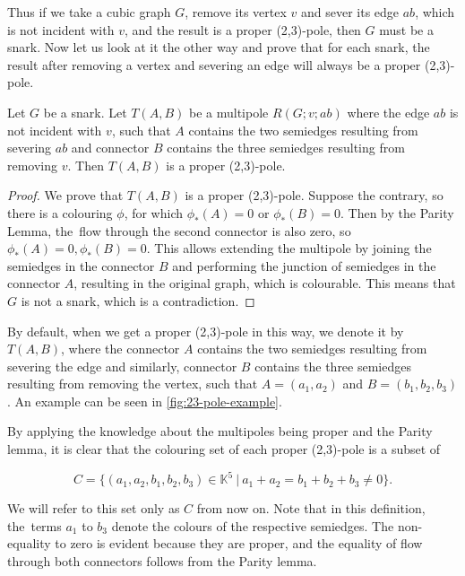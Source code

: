 Thus if we take a cubic graph $G$, remove its vertex $v$ and sever its edge $ab$, which is not incident with $v$, and the result is a proper (2,3)-pole, then $G$ must be a snark. Now let us look at it the other way and prove that for each snark, the result after removing a vertex and severing an edge will always be a proper (2,3)-pole.

\begin{lemma}
	Let $G$ be a snark. Let $T(A,B)$ be a multipole $R(G;v;ab)$ where the edge $ab$ is not incident with $v$, such that $A$ contains the two semiedges resulting from severing $ab$ and connector $B$ contains the three semiedges resulting from removing $v$. Then $T(A,B)$ is a proper (2,3)-pole.
\end{lemma}

\begin{proof}
	We prove that $T(A,B)$ is a proper (2,3)-pole. Suppose the contrary, so there is a colouring $\phi$, for which $\phi_*(A)=0$ or $\phi_*(B)=0$. Then by the Parity Lemma, the~flow through the second connector is also zero, so $\phi_*(A)=0, \phi_*(B)=0$. This allows extending the multipole by joining the semiedges in the connector $B$ and performing the junction of semiedges in the connector $A$, resulting in the original graph, which is colourable. This means that $G$ is not a snark, which is a contradiction.
\end{proof}

By default, when we get a proper (2,3)-pole in this way, we denote it by $T(A,B)$, where the connector $A$ contains the two semiedges resulting from severing the edge and similarly, connector $B$ contains the three semiedges resulting from removing the vertex, such that $A=(a_1,a_2)$ and $B=(b_1,b_2,b_3)$. An example can be seen in \cref{fig:23-pole-example}.

\begin{figure*}
	\centering
	
	\caption{Creation of a proper $(2,3)$-pole from a snark $G$}
	\label{fig:23-pole-example}
\end{figure*}

By applying the knowledge about the multipoles being proper and the Parity lemma, it is clear that the colouring set of each proper (2,3)-pole is a subset of

$$C=\{(a_1,a_2,b_1,b_2,b_3)\in\mathbb{K}^5~|~a_1+a_2=b_1+b_2+b_3\neq 0\}.$$

We will refer to this set only as $C$ from now on. Note that in this definition, the~terms $a_1$ to $b_3$ denote the colours of the respective semiedges. The non-equality to zero is evident because they are proper, and the equality of flow through both connectors follows from the Parity lemma.

